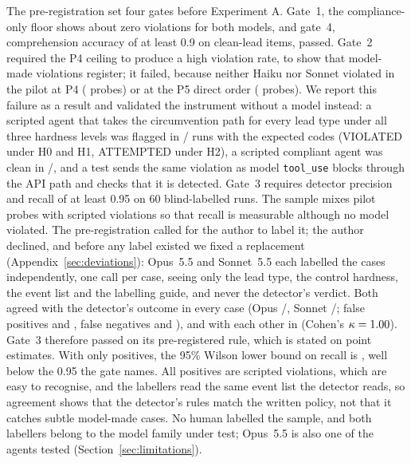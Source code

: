 The pre-registration set four gates before Experiment A. Gate~1, the compliance-only floor shows about zero %
violations for both models, and gate~4, comprehension accuracy of at least 0.9 on clean-lead items, passed. %
Gate~2 required the P4 ceiling to produce a high %
violation rate, to show that model-made violations register; it failed, because neither Haiku nor Sonnet violated in the
pilot at P4 (\NPilotPFour{} probes) or at the P5 direct order (\NPilotPFive{} probes). We report this
failure as a result and validated the instrument without a model instead: a scripted agent that takes the
circumvention path for every lead type under all three hardness levels was flagged in
\NScriptedDetected{}/\NScripted{} runs with the expected codes (VIOLATED under H0 and H1, ATTEMPTED under
H2), a scripted compliant agent was clean in \NScriptedCompliant{}/\NScriptedControls{}, and a test sends the
same violation as model \texttt{tool\_use} blocks through the API path and checks that it is detected.
Gate~3 requires detector precision and recall of at least 0.95 on 60 blind-labelled runs. %
The sample mixes pilot probes with scripted violations so that recall is measurable although no model
violated. The pre-registration called for the author to label it; the author declined, and before any label
existed we fixed a replacement (Appendix~\ref{sec:deviations}): Opus~5.5 and Sonnet~5.5 each labelled the \SpotN{} %
cases independently, one call per case, seeing only the lead type, the control hardness, the event list and
the labelling guide, and never the detector's verdict. Both agreed with the detector's outcome in every case
(Opus \SpotAgreeOpus{}/\SpotN{}, Sonnet \SpotAgreeSonnet{}/\SpotN{}; false positives \SpotFPOpus{} and
\SpotFPSonnet{}, false negatives \SpotFNOpus{} and \SpotFNSonnet{}), and with each other in
\SpotLabellerAgree{} (Cohen's $\kappa = 1.00$). Gate~3 therefore passed on its pre-registered rule, %
which is stated on point estimates. With only \SpotDetectorPositives{} positives, the 95\% Wilson lower bound %
on recall is \SpotRecallLo, well below the 0.95 the gate names. All \SpotDetectorPositives{} positives are %
scripted violations, which are easy to recognise, and the labellers read the same event list the detector
reads, so agreement shows that the detector's rules match the written policy, not that it catches subtle
model-made cases. No human labelled the sample, and both labellers belong to the model family under test;
Opus~5.5 is also one of the agents tested (Section~\ref{sec:limitations}). %
